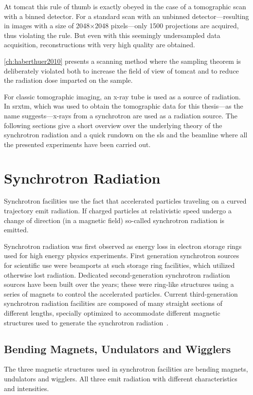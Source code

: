 At \ac{tomcat} this rule of thumb is exactly obeyed in the case of a tomographic scan with a binned detector. For a standard scan with an unbinned detector---resulting in images with a size of 2048$\times$2048 pixels---only 1500 projections are acquired, thus violating the rule. But even with this seemingly undersampled data acquisition, reconstructions with very high quality are obtained.

\autoref{ch:haberthuer2010} presents a scanning method where the sampling theorem is deliberately violated both to increase the field of view of \ac{tomcat} and to reduce the radiation dose imparted on the sample.

For classic tomographic imaging, an x-ray tube is used as a source of radiation. In \ac{srxtm}, which was used to obtain the tomographic data for this thesis---as the name suggests---x-rays from a synchrotron are used as a radiation source. The following sections give a short overview over the underlying theory of the synchrotron radiation and a quick rundown on the \ac{sls} and the beamline where all the presented experiments have been carried out.

\section{Synchrotron Radiation}
Synchrotron facilities use the fact that accelerated particles traveling on a curved trajectory emit radiation. If charged particles at relativistic speed undergo a change of direction (\ie in a magnetic field) so-called synchrotron radiation is emitted. 

Synchrotron radiation was first observed as energy loss in electron storage rings used for high energy physics experiments. First generation synchrotron sources for scientific use were beamports at such storage ring facilities, which utilized otherwise lost radiation. Dedicated second-generation synchrotron radiation sources have been built over the years; these were ring-like structures using a series of magnets to control the accelerated particles. Current third-generation synchrotron radiation facilities are composed of many straight sections of different lengths, specially optimized to accommodate different magnetic structures used to generate the synchrotron radiation~\cite{Stampanoni2002a,Margaritondo2002,wwwsls}. 

\subsection{Bending Magnets, Undulators and Wigglers}
The three magnetic structures used in synchrotron facilities are bending magnets, undulators and wigglers. All three emit radiation with different characteristics and intensities.

